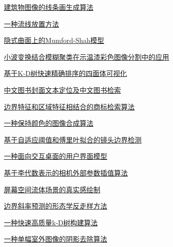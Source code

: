 \documentclass[a4paper]{article}
\begin{document}
\href{http://www.jos.org.cn/ch/reader/download_pdf.aspx?file_no=12022&year_id=2012&quarter_id=zk2&falg=1}{建筑物图像的线条画生成算法}

\href{http://www.jos.org.cn/ch/reader/download_pdf.aspx?file_no=12023&year_id=2012&quarter_id=zk2&falg=1}{一种流线放置方法}

\href{http://www.jos.org.cn/ch/reader/download_pdf.aspx?file_no=12024&year_id=2012&quarter_id=zk2&falg=1}{隐式曲面上的Mumford-Shah模型}

\href{http://www.jos.org.cn/ch/reader/download_pdf.aspx?file_no=12025&year_id=2012&quarter_id=zk2&falg=1}{小波变换结合模糊聚类在示温漆彩色图像分割中的应用}

\href{http://www.jos.org.cn/ch/reader/download_pdf.aspx?file_no=12026&year_id=2012&quarter_id=zk2&falg=1}{基于K-D树快速精确排序的四面体可视化}

\href{http://www.jos.org.cn/ch/reader/download_pdf.aspx?file_no=12027&year_id=2012&quarter_id=zk2&falg=1}{中文图书封面文本定位及中文图书检索}

\href{http://www.jos.org.cn/ch/reader/download_pdf.aspx?file_no=12028&year_id=2012&quarter_id=zk2&falg=1}{边界特征和区域特征相结合的商标检索算法}

\href{http://www.jos.org.cn/ch/reader/download_pdf.aspx?file_no=12029&year_id=2012&quarter_id=zk2&falg=1}{一种保持颜色的图像合成算法}

\href{http://www.jos.org.cn/ch/reader/download_pdf.aspx?file_no=12030&year_id=2012&quarter_id=zk2&falg=1}{基于自适应阈值和傅里叶拟合的镜头边界检测}

\href{http://www.jos.org.cn/ch/reader/download_pdf.aspx?file_no=12031&year_id=2012&quarter_id=zk2&falg=1}{一种面向交互桌面的用户界面模型}

\href{http://www.jos.org.cn/ch/reader/download_pdf.aspx?file_no=12032&year_id=2012&quarter_id=zk2&falg=1}{基于李代数表示的相机外部参数插值算法}

\href{http://www.jos.org.cn/ch/reader/download_pdf.aspx?file_no=12033&year_id=2012&quarter_id=zk2&falg=1}{屏幕空间流体场景的真实感绘制}

\href{http://www.jos.org.cn/ch/reader/download_pdf.aspx?file_no=12034&year_id=2012&quarter_id=zk2&falg=1}{边界斜率预测的形态学反走样方法}

\href{http://www.jos.org.cn/ch/reader/download_pdf.aspx?file_no=12035&year_id=2012&quarter_id=zk2&falg=1}{一种快速高质量k-D树构建算法}

\href{http://www.jos.org.cn/ch/reader/download_pdf.aspx?file_no=12036&year_id=2012&quarter_id=zk2&falg=1}{一种单幅室外图像的阴影去除算法}
\end{document}
